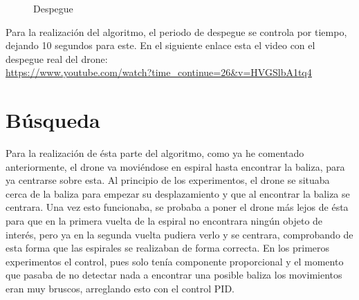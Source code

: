 \begin{figure}[H]
 \centering
 \caption{Despegue}
 \label{f:Test Despegue}
\end{figure}

Para la realizaci\'on del algoritmo, el periodo de despegue se controla por tiempo, dejando 10 segundos para este. 
En el siguiente enlace esta el video con el despegue real del drone:\\
\underline{\url{https://www.youtube.com/watch?time_continue=26&v=HVGSlbA1tq4}}

\section{B\'usqueda } Para la realizaci\'on de \'esta parte del algoritmo, como ya he comentado anteriormente, el drone va movi\'endose en espiral hasta encontrar la baliza, para ya centrarse sobre esta. Al principio de los experimentos, el drone se situaba cerca de la baliza para empezar su desplazamiento y que al encontrar la baliza se centrara. Una vez esto funcionaba, se probaba a poner el drone m\'as lejos de \'esta para que en la primera vuelta de la espiral no encontrara ning\'un objeto de inter\'es, pero ya en la segunda vuelta pudiera verlo y se centrara, comprobando de esta forma que las espirales se realizaban de forma correcta. En los primeros experimentos el control, pues solo ten\'ia componente proporcional y el momento que pasaba de no detectar nada a encontrar una posible baliza los movimientos eran muy bruscos, arreglando esto con el control PID. 

